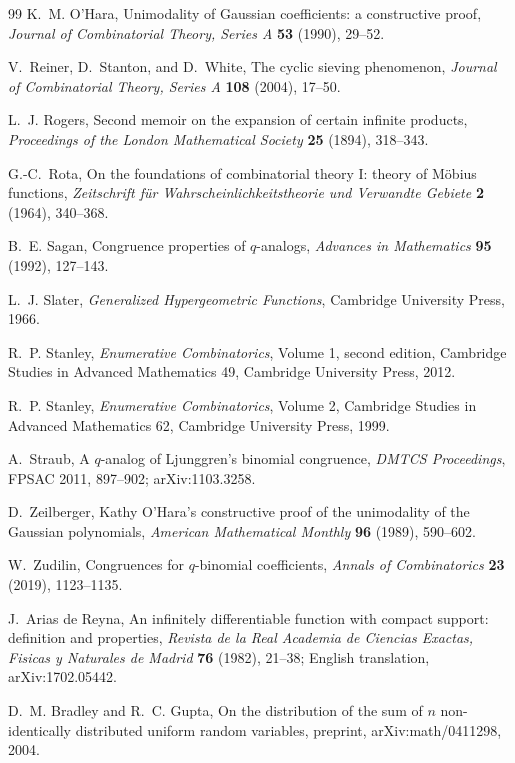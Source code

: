 \documentclass[11pt,oneside,openany]{book}
\theoremstyle{definition}
\theoremstyle{remark}
\begin{document}
\begin{thebibliography}{99}
K.~M. O'Hara,
Unimodality of Gaussian coefficients: a constructive proof,
\emph{Journal of Combinatorial Theory, Series A} \textbf{53} (1990), 29--52.

V.~Reiner, D.~Stanton, and D.~White,
The cyclic sieving phenomenon,
\emph{Journal of Combinatorial Theory, Series A} \textbf{108} (2004), 17--50.

L.~J. Rogers,
Second memoir on the expansion of certain infinite products,
\emph{Proceedings of the London Mathematical Society} \textbf{25} (1894), 318--343.

G.-C.~Rota,
On the foundations of combinatorial theory I: theory of M\"obius functions,
\emph{Zeitschrift f\"ur Wahrscheinlichkeitstheorie und Verwandte Gebiete} \textbf{2} (1964), 340--368.

B.~E. Sagan,
Congruence properties of $q$-analogs,
\emph{Advances in Mathematics} \textbf{95} (1992), 127--143.

L.~J. Slater,
\emph{Generalized Hypergeometric Functions},
Cambridge University Press, 1966.

R.~P. Stanley,
\emph{Enumerative Combinatorics}, Volume 1, second edition,
Cambridge Studies in Advanced Mathematics 49, Cambridge University Press, 2012.

R.~P. Stanley,
\emph{Enumerative Combinatorics}, Volume 2,
Cambridge Studies in Advanced Mathematics 62, Cambridge University Press, 1999.

A.~Straub,
A $q$-analog of Ljunggren's binomial congruence,
\emph{DMTCS Proceedings}, FPSAC 2011, 897--902; arXiv:1103.3258.

D.~Zeilberger,
Kathy O'Hara's constructive proof of the unimodality of the Gaussian polynomials,
\emph{American Mathematical Monthly} \textbf{96} (1989), 590--602.

W.~Zudilin,
Congruences for $q$-binomial coefficients,
\emph{Annals of Combinatorics} \textbf{23} (2019), 1123--1135.


J.~Arias de Reyna,
An infinitely differentiable function with compact support: definition and properties,
\emph{Revista de la Real Academia de Ciencias Exactas, Fisicas y Naturales de Madrid} \textbf{76} (1982), 21--38;
English translation, arXiv:1702.05442.

D.~M. Bradley and R.~C. Gupta,
On the distribution of the sum of $n$ non-identically distributed uniform random variables,
preprint, arXiv:math/0411298, 2004.


\end{thebibliography}
\end{document}
